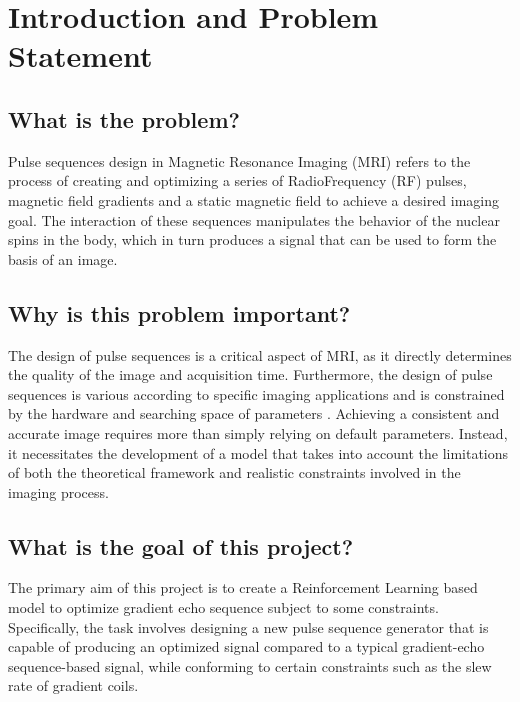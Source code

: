 \section{Introduction and Problem Statement}
\subsection{What is the problem?}
Pulse sequences design in Magnetic Resonance Imaging (MRI) refers to the process of creating and optimizing a series of RadioFrequency (RF) pulses, magnetic field gradients and a static magnetic field to achieve a desired imaging goal. The interaction of these sequences manipulates the behavior of the nuclear spins in the body, which in turn produces a signal that can be used to form the basis of an image.

\subsection{Why is this problem important?}
The design of pulse sequences is a critical aspect of MRI, as it directly determines the quality of the image and acquisition time. Furthermore, the design of pulse sequences is various according to specific imaging applications and is constrained by the hardware and searching space of parameters \citep{0438}. Achieving a consistent and accurate image requires more than simply relying on default parameters. Instead, it necessitates the development of a model that takes into account the limitations of both the theoretical framework and realistic constraints involved in the imaging process.

\subsection{What is the goal of this project?}
The primary aim of this project is to create a Reinforcement Learning based model to optimize gradient echo sequence subject to some constraints. Specifically, the task involves designing a new pulse sequence generator that is capable of producing an optimized signal compared to a typical gradient-echo sequence-based signal, while conforming to certain constraints such as the slew rate of gradient coils.